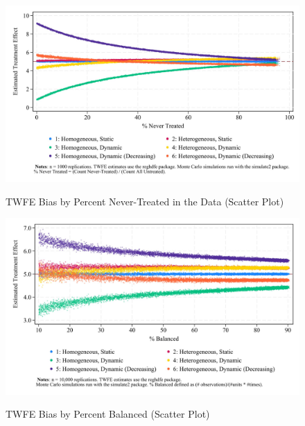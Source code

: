 \documentclass[12pt]{article}
\begin{document}
\begin{figure}
    \centering
    \caption{TWFE Bias by Percent Never-Treated in the Data (Scatter Plot)}
    \includegraphics[width=5in]{Figures/TWFE Bias by Percent Never Treated Scatter.jpg}
    \label{fig:scatter-nevertreat}
\end{figure}

\begin{figure}
    \centering
    \caption{TWFE Bias by Percent Balanced (Scatter Plot)}
    \includegraphics[width=5in]{Figures/TWFE Bias by Percent Balanced Scatter Crop.jpg}
    \label{fig:scatter-balance}
\end{figure}
\end{document}
